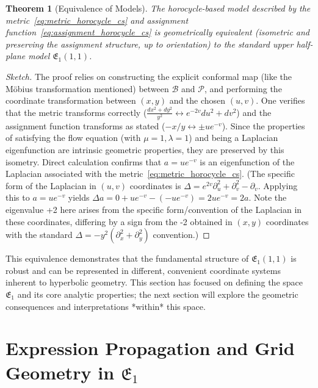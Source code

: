 \documentclass[12pt]{article}
\newtheorem{theorem}{Theorem}[section]
\begin{document}
\begin{theorem}[Equivalence of Models]\label{thm:horocycle_equiv_cs}
The horocycle-based model described by the metric~\eqref{eq:metric_horocycle_cs} and assignment function~\eqref{eq:assignment_horocycle_cs} is geometrically equivalent (isometric and preserving the assignment structure, up to orientation) to the standard upper half-plane model \( \mathfrak{E}_1(1, 1) \).
\end{theorem}
\begin{proof}[Sketch]
The proof relies on constructing the explicit conformal map (like the Möbius transformation mentioned) between \( \mathcal{B} \) and \( \mathcal{P} \), and performing the coordinate transformation between \( (x, y) \) and the chosen \( (u, v) \). One verifies that the metric transforms correctly (\( \frac{dx^2+dy^2}{y^2} \leftrightarrow e^{-2v}du^2+dv^2 \)) and the assignment function transforms as stated (\( -x/y \leftrightarrow \pm u e^{-v} \)). Since the properties of satisfying the flow equation (with \( \mu=1, \lambda=1 \)) and being a Laplacian eigenfunction are intrinsic geometric properties, they are preserved by this isometry. Direct calculation confirms that \( a = u e^{-v} \) is an eigenfunction of the Laplacian associated with the metric~\eqref{eq:metric_horocycle_cs}. (The specific form of the Laplacian in \( (u, v) \) coordinates is \( \Delta = e^{2v} \partial_u^2 + \partial_v^2 - \partial_v \). Applying this to \( a=ue^{-v} \) yields \( \Delta a = 0 + ue^{-v} - (-ue^{-v}) = 2ue^{-v} = 2a \). Note the eigenvalue +2 here arises from the specific form/convention of the Laplacian in these coordinates, differing by a sign from the -2 obtained in \( (x, y) \) coordinates with the standard \( \Delta = -y^2(\partial_x^2+\partial_y^2) \) convention.)
\end{proof}

This equivalence demonstrates that the fundamental structure of \( \mathfrak{E}_1(1, 1) \) is robust and can be represented in different, convenient coordinate systems inherent to hyperbolic geometry. This section has focused on defining the space \( \mathfrak{E}_1 \) and its core analytic properties; the next section will explore the geometric consequences and interpretations *within* this space.

\section{Expression Propagation and Grid Geometry in \( \mathfrak{E}_1 \)} %
\end{document}
